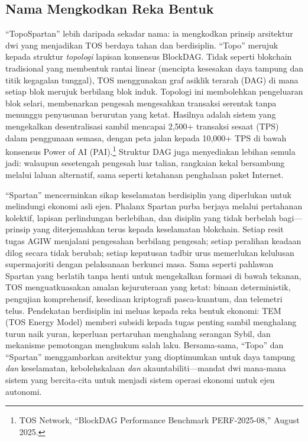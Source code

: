 \documentclass[11pt]{article}
\begin{document}
\subsection{Nama Mengkodkan Reka Bentuk}
``TopoSpartan'' lebih daripada sekadar nama: ia mengkodkan prinsip arsitektur dwi yang menjadikan TOS berdaya tahan dan berdisiplin. ``Topo'' merujuk kepada struktur \emph{topologi} lapisan konsensus BlockDAG. Tidak seperti blokchain tradisional yang membentuk rantai linear (mencipta kesesakan daya tampung dan titik kegagalan tunggal), TOS menggunakan graf asiklik terarah (DAG) di mana setiap blok merujuk berbilang blok induk. Topologi ini membolehkan pengeluaran blok selari, membenarkan pengesah mengesahkan transaksi serentak tanpa menunggu penyusunan berurutan yang ketat. Hasilnya adalah sistem yang mengekalkan desentralisasi sambil mencapai 2,500+ transaksi sesaat (TPS) dalam penggunaan semasa, dengan peta jalan kepada 10,000+ TPS di bawah konsensus Power of AI (PAI).\footnote{TOS Network, ``BlockDAG Performance Benchmark PERF-2025-08,'' August 2025.} Struktur DAG juga menyediakan lebihan semula jadi: walaupun sesetengah pengesah luar talian, rangkaian kekal bersambung melalui laluan alternatif, sama seperti ketahanan penghalaan paket Internet.

``Spartan'' mencerminkan sikap keselamatan berdisiplin yang diperlukan untuk melindungi ekonomi asli ejen. Phalanx Spartan purba berjaya melalui pertahanan kolektif, lapisan perlindungan berlebihan, dan disiplin yang tidak berbelah bagi---prinsip yang diterjemahkan terus kepada keselamatan blokchain. Setiap resit tugas AGIW menjalani pengesahan berbilang pengesah; setiap peralihan keadaan dilog secara tidak berubah; setiap keputusan tadbir urus memerlukan kelulusan supermajoriti dengan pelaksanaan berkunci masa. Sama seperti pahlawan Spartan yang berlatih tanpa henti untuk mengekalkan formasi di bawah tekanan, TOS menguatkuasakan amalan kejuruteraan yang ketat: binaan deterministik, pengujian komprehensif, kesediaan kriptografi pasca-kuantum, dan telemetri telus. Pendekatan berdisiplin ini meluas kepada reka bentuk ekonomi: TEM (TOS Energy Model) memberi subsidi kepada tugas penting sambil menghalang turun naik yuran, keperluan pertaruhan menghalang serangan Sybil, dan mekanisme pemotongan menghukum salah laku. Bersama-sama, ``Topo'' dan ``Spartan'' menggambarkan arsitektur yang dioptimumkan untuk daya tampung \emph{dan} keselamatan, kebolehskalaan \emph{dan} akauntabiliti---mandat dwi mana-mana sistem yang bercita-cita untuk menjadi sistem operasi ekonomi untuk ejen autonomi.
\end{document}
